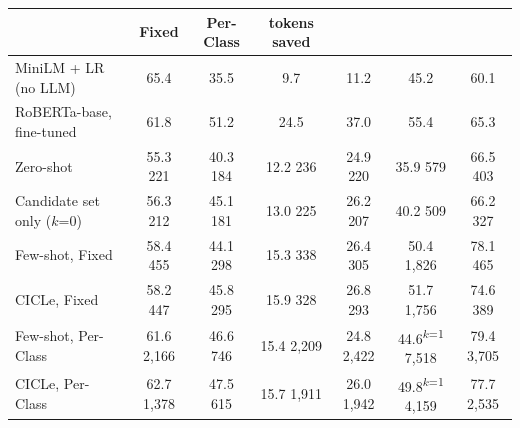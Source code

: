 \begin{tabular}{lcccccc}
\toprule
 & Fixed & Per-Class & tokens saved \\
\midrule
MiniLM + LR (no LLM) & 65.4 & 35.5 & 9.7 & 11.2 & 45.2 & 60.1 \\
RoBERTa-base, fine-tuned & 61.8 & 51.2 & 24.5 & 37.0 & 55.4 & 65.3 \\
\midrule
Zero-shot & 55.3 {\scriptsize 221} & 40.3 {\scriptsize 184} & 12.2 {\scriptsize 236} & 24.9 {\scriptsize 220} & 35.9 {\scriptsize 579} & 66.5 {\scriptsize 403} \\
Candidate set only ($k$=0) & 56.3 {\scriptsize 212} & 45.1 {\scriptsize 181} & 13.0 {\scriptsize 225} & 26.2 {\scriptsize 207} & 40.2 {\scriptsize 509} & 66.2 {\scriptsize 327} \\
Few-shot, Fixed & 58.4 {\scriptsize 455} & 44.1 {\scriptsize 298} & 15.3 {\scriptsize 338} & 26.4 {\scriptsize 305} & 50.4 {\scriptsize 1,826} & 78.1 {\scriptsize 465} \\
CICLe, Fixed & 58.2 {\scriptsize 447} & 45.8 {\scriptsize 295} & 15.9 {\scriptsize 328} & 26.8 {\scriptsize 293} & 51.7 {\scriptsize 1,756} & 74.6 {\scriptsize 389} \\
Few-shot, Per-Class & 61.6 {\scriptsize 2,166} & 46.6 {\scriptsize 746} & 15.4 {\scriptsize 2,209} & 24.8 {\scriptsize 2,422} & 44.6\textsuperscript{$k$=1} {\scriptsize 7,518} & 79.4 {\scriptsize 3,705} \\
CICLe, Per-Class & 62.7 {\scriptsize 1,378} & 47.5 {\scriptsize 615} & 15.7 {\scriptsize 1,911} & 26.0 {\scriptsize 1,942} & 49.8\textsuperscript{$k$=1} {\scriptsize 4,159} & 77.7 {\scriptsize 2,535} \\
\midrule

\end{tabular}
